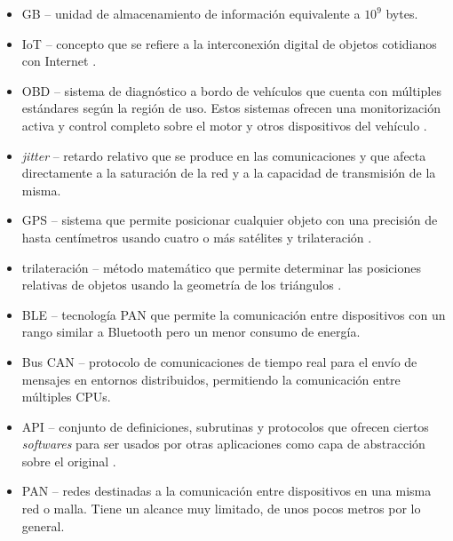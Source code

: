 \begin{acronym}
\end{acronym}

\begin{itemize}
  \item \ac{GB} -- unidad de almacenamiento de información equivalente a $10^9$ bytes.
  \item \ac{IoT} -- concepto que se refiere a la interconexión digital de objetos 
        cotidianos con Internet \cite{InternetCosas2021}.
  \item \ac{OBD} -- sistema de diagnóstico a bordo de vehículos que
        cuenta con múltiples estándares según la región de uso. Estos
        sistemas ofrecen una monitorización activa y control completo
        sobre el motor y otros dispositivos del vehículo \cite{OBD2021}.
  \item \textit{jitter} -- retardo relativo que se produce en las comunicaciones
        y que afecta directamente a la saturación de la red y a la capacidad de
        transmisión de la misma.
  \item \ac{GPS} -- sistema que permite posicionar cualquier objeto con una 
        precisión de hasta centímetros usando cuatro o más satélites y 
        trilateración \cite{GPS2021}.
  \item trilateración -- método matemático que permite determinar las posiciones
        relativas de objetos usando la geometría de los triángulos \cite{Trilateracion2021}.
  \item \ac{BLE} -- tecnología \ac{PAN} que permite la comunicación entre dispositivos
        con un rango similar a Bluetooth pero un menor consumo de energía.
  \item Bus \ac{CAN} -- protocolo de comunicaciones de tiempo real para el envío de
        mensajes en entornos distribuidos, permitiendo la comunicación
        entre múltiples CPUs.
  \item \ac{API} -- conjunto de definiciones, subrutinas y protocolos que ofrecen
        ciertos \textit{softwares} para ser usados por otras aplicaciones como
        capa de abstracción sobre el original \cite{InterfazProgramacionAplicaciones2021}.
  \item \ac{PAN} -- redes destinadas a la comunicación entre dispositivos en una
        misma red o malla. Tiene un alcance muy limitado, de unos pocos metros por
        lo general.
\end{itemize}